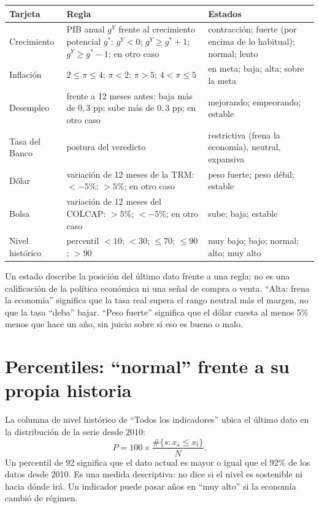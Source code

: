 \begin{center}
\small
\begin{tabularx}{\linewidth}{>{\raggedright\arraybackslash}p{2.6cm}X>{\raggedright\arraybackslash}p{4.2cm}}
\toprule
\textbf{Tarjeta} & \textbf{Regla} & \textbf{Estados}\\
\midrule
Crecimiento & PIB anual $g^Y$ frente al crecimiento potencial $g^*$: $g^Y<0$; $g^Y\ge g^*+1$; $g^Y\ge g^*-1$; en otro caso & contracción; fuerte (por encima de lo habitual); normal; lento\\
Inflación & $2\le\pi\le4$; $\pi<2$; $\pi>5$; $4<\pi\le5$ & en meta; baja; alta; sobre la meta\\
Desempleo & frente a 12 meses antes: baja más de $0{,}3$ pp; sube más de $0{,}3$ pp; en otro caso & mejorando; empeorando; estable\\
Tasa del Banco & postura del veredicto & restrictiva (frena la economía), neutral, expansiva\\
Dólar & variación de 12 meses de la TRM: $<-5\%$; $>5\%$; en otro caso & peso fuerte; peso débil; estable\\
Bolsa & variación de 12 meses del COLCAP: $>5\%$; $<-5\%$; en otro caso & sube; baja; estable\\
Nivel histórico & percentil $<10$; $<30$; $\le70$; $\le90$; $>90$ & muy bajo; bajo; normal; alto; muy alto\\
\bottomrule
\end{tabularx}
\end{center}

\begin{leer}
Un estado describe la posición del último dato frente a una regla; no es una calificación de la política económica
ni una señal de compra o venta. ``Alta: frena la economía'' significa que la tasa real supera el rango neutral más el
margen, no que la tasa ``deba'' bajar. ``Peso fuerte'' significa que el dólar cuesta al menos 5\% menos que hace un
año, sin juicio sobre si eso es bueno o malo.
\end{leer}

\section{Percentiles: ``normal'' frente a su propia historia}

La columna de nivel histórico de ``Todos los indicadores'' ubica el último dato en la distribución de la serie desde
2010:
\[
P = 100\times\frac{\#\{s : x_s \le x_t\}}{N}.
\]
Un percentil de 92 significa que el dato actual es mayor o igual que el 92\% de los datos desde 2010. Es una medida
descriptiva: no dice si el nivel es sostenible ni hacia dónde irá. Un indicador puede pasar años en ``muy alto'' si
la economía cambió de régimen.

